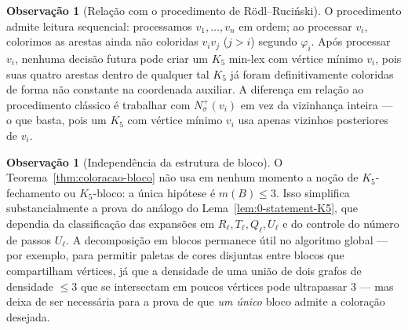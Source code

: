 \documentclass[reqno, 12pt]{amsart}
\numberwithin{equation}{section}
\theoremstyle{plain}
\theoremstyle{definition}
\newtheorem{remark}[theorem]{Observação}
\begin{document}
\begin{remark}[Relação com o procedimento de Rödl--Ruciński]
  O procedimento admite leitura sequencial: processamos
  $v_1,\ldots,v_n$ em ordem; ao processar $v_i$, colorimos as arestas
  ainda não coloridas $v_iv_j$ ($j>i$) segundo $\varphi_i$. Após
  processar $v_i$, nenhuma decisão futura pode criar um $K_5$
  min-lex com vértice mínimo $v_i$, pois suas quatro arestas dentro
  de qualquer tal $K_5$ já foram definitivamente coloridas de forma
  não constante na coordenada auxiliar. A diferença em relação ao
  procedimento clássico é trabalhar com $N_\sigma^+(v_i)$ em vez da
  vizinhança inteira — o que basta, pois um $K_5$ com vértice mínimo
  $v_i$ usa apenas vizinhos posteriores de $v_i$.
\end{remark}

\begin{remark}[Independência da estrutura de bloco]
  O Teorema~\ref{thm:coloracao-bloco} não usa em nenhum momento
  a noção de $K_5$-fechamento ou $K_5$-bloco: a única hipótese é
  $m(B)\leq 3$. Isso simplifica substancialmente a prova do análogo
  do Lema~\ref{lem:0-statement-K5}, que dependia da classificação das expansões
  em $R_\ell,T_\ell,Q_\ell,U_\ell$ e do controle do número de passos
  $U_\ell$. A decomposição em blocos permanece útil no algoritmo
  global — por exemplo, para permitir paletas de cores disjuntas
  entre blocos que compartilham vértices, já que a densidade de uma
  união de dois grafos de densidade $\leq 3$ que se intersectam em
  poucos vértices pode ultrapassar $3$ — mas deixa de ser necessária
  para a prova de que \emph{um único} bloco admite a coloração
  desejada.
\end{remark}


\vspace{1cm}

\printbibliography
\end{document}
